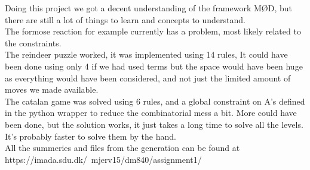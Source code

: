 \documentclass[a4paper,10pt,titlepage]{report}
\begin{document}
Doing this project we got a decent understanding of the framework MØD, but there are still a lot of things to learn and concepts to understand.\\
The formose reaction for example currently has a problem, most likely related to the constraints. \\
The reindeer puzzle worked, it was implemented using 14 rules, It could have been done using only 4 if we had used terms but the space would have been huge as everything would have been considered, and not just the limited amount of moves we made available.\\
The catalan game was solved using 6 rules, and a global constraint on A's defined in the python wrapper to reduce the combinatorial mess a bit. More could have been done, but the solution works, it just takes a long time to solve all the levels. It's probably faster to solve them by the hand.
\\
All the summeries and files from the generation can be found at\\
https://imada.sdu.dk/~mjerv15/dm840/assignment1/
\end{document}
